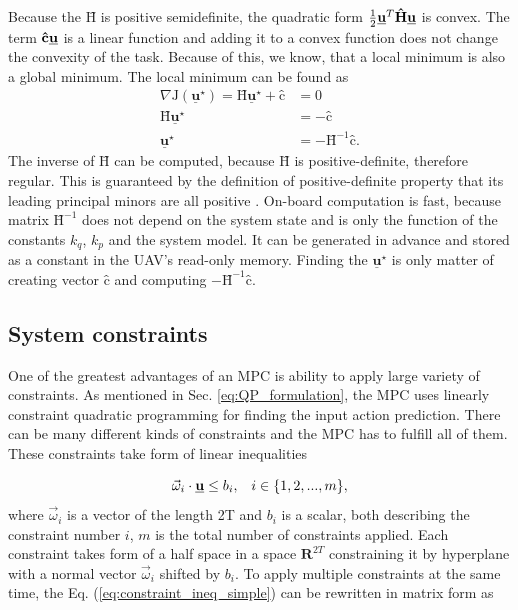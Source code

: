 \documentclass[a4paper,11pt,titlepage]{article}
\newcommand{\uvec}{\textbf{\underline{u}}}
\newcommand{\macoi}{\vec{\omega}_i}
\begin{document}
Because the  $\textbf{\^H}$ is positive semidefinite, the quadratic form $\frac{1}{2}\uvec^T\textbf{\^H}\uvec$ is convex. The term $\textbf{\^c} \uvec$ is a linear function and adding it to a convex function does not change the convexity of the task. Because of this, we know, that a local minimum is also a global minimum. The local minimum can be found as 
\begin{equation}
\label{eq:J_local_min}
\begin{split}
\nabla\mathrm{J}(\underline{\textbf{u}}^{\star}) = \textbf{\^H}\underline{\textbf{u}}^{\star} + \textbf{\^c} &= 0 \\
\textbf{\^H}\underline{\textbf{u}}^{\star} &= - \textbf{\^c} \\
\underline{\textbf{u}}^{\star} &= -\textbf{\^H}^{-1}\textbf{\^c}.
\end{split}
\end{equation}
The inverse of $\textbf{\^H}$ can be computed, because $\textbf{\^H}$ is positive-definite, therefore regular. This is guaranteed by the definition of positive-definite property that its leading principal minors are all positive \cite{chong2013introduction}. On-board computation is fast, because matrix $\textbf{\^H}^{-1}$ does not depend on the system state and is only the function of the constants $k_q$, $k_p$ and the system model. It can be generated in advance and stored as a constant in the UAV's read-only memory. Finding the $\underline{\textbf{u}}^{\star}$ is only matter of creating vector $\textbf{\^c}$ and computing $-\textbf{\^H}^{-1}\textbf{\^c}$.


\subsection{System constraints} \label{sec:system_constraints}
One of the greatest advantages of an MPC is ability to apply large variety of constraints. As mentioned in Sec. \ref{eq:QP_formulation}, the MPC uses linearly constraint quadratic programming for finding the input action prediction. There can be many different kinds of constraints and the MPC has to fulfill all of them. These constraints take form of linear inequalities

\begin{equation}
\label{eq:constraint_ineq_simple}
\macoi \cdot \uvec \leq b_i, \;\;\; i \in \{1, 2, ..., m\},
\end{equation}
where $\vec{\omega}_i$ is a vector of the length 2T and $b_i$ is a scalar, both describing the constraint number $i$, $m$ is the total number of constraints applied. Each constraint takes form of a half space in a space $\textbf{R}^{2T}$ constraining it by hyperplane with a normal vector $\vec{\omega}_i$ shifted by $b_i$. To apply multiple constraints at the same time, the Eq. (\ref{eq:constraint_ineq_simple}) can be rewritten in matrix form as 
\end{document}
